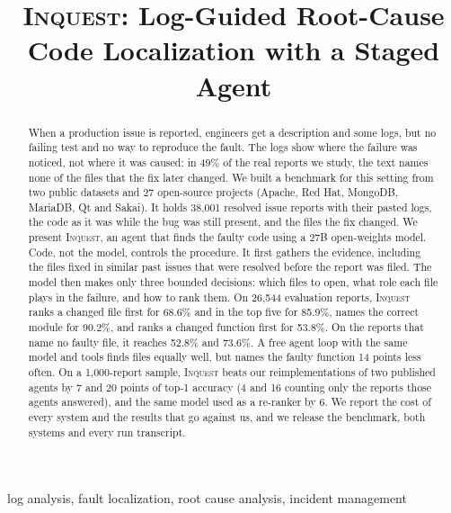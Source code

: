\documentclass[10pt,conference]{IEEEtran}
\newcommand{\sys}{\textsc{Inquest}\xspace}
\begin{document}
\title{\textsc{Inquest}: Log-Guided Root-Cause Code Localization with a Staged Agent}

\author{}

\maketitle

\begin{abstract}
When a production issue is reported, engineers get a description and some logs, but no failing test and no way to reproduce the fault. The logs show where the failure was noticed, not where it was caused: in 49\% of the real reports we study, the text names none of the files that the fix later changed. We built a benchmark for this setting from two public datasets and 27 open-source projects (Apache, Red Hat, MongoDB, MariaDB, Qt and Sakai). It holds 38,001 resolved issue reports with their pasted logs, the code as it was while the bug was still present, and the files the fix changed. We present \sys{}, an agent that finds the faulty code using a 27B open-weights model. Code, not the model, controls the procedure. It first gathers the evidence, including the files fixed in similar past issues that were resolved before the report was filed. The model then makes only three bounded decisions: which files to open, what role each file plays in the failure, and how to rank them. On 26,544 evaluation reports, \sys{} ranks a changed file first for 68.6\% and in the top five for 85.9\%, names the correct module for 90.2\%, and ranks a changed function first for 53.8\%. On the reports that name no faulty file, it reaches 52.8\% and 73.6\%. A free agent loop with the same model and tools finds files equally well, but names the faulty function 14 points less often. On a 1,000-report sample, \sys{} beats our reimplementations of two published agents by 7 and 20 points of top-1 accuracy (4 and 16 counting only the reports those agents answered), and the same model used as a re-ranker by 6. We report the cost of every system and the results that go against us, and we release the benchmark, both systems and every run transcript.
\end{abstract}

\begin{IEEEkeywords}
log analysis, fault localization, root cause analysis, incident management
\end{IEEEkeywords}













\end{document}
